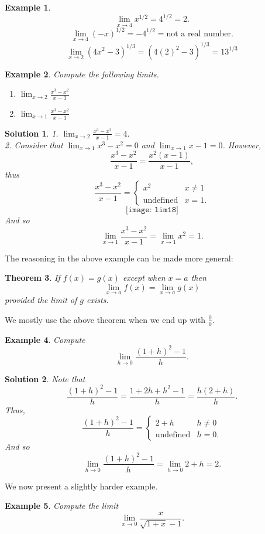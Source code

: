 \documentclass[12pt,a4paper]{book}
\newtheorem{theorem}{Theorem}[section]
\newtheorem{Example}[theorem]{Example}
\numberwithin{equation}{section}
\newtheorem*{solution}{{\bf Solution}}
\begin{document}
\begin{Example}
	$$\lim_{x\to 4}x^{1/2}=4^{1/2}=2.$$
	$$\lim_{x\to 4}(-x)^{1/2}=-4^{1/2}=\text{not a real number}.$$
	$$ \lim_{x\to 2} (4x^2-3)^{1/3}= (4(2)^2-3)^{1/3}=13^{1/3}$$
\end{Example}

\begin{Example} Compute the following limits.
\begin{enumerate}	
	\item $\lim_{x\to 2} \frac{x^3-x^2}{x-1}$
\item $\lim_{x\to 1} \frac{x^3-x^2}{x-1}$
\end{enumerate}
\end{Example}

\begin{solution}
	1. $\lim_{x\to 2} \frac{x^3-x^2}{x-1}=4.$\\
	2. Consider that $\lim_{x\to 1} {x^3-x^2}=0$ and $\lim_{x\to 1} {x-1}=0$. However, 
	$$ \frac{x^3-x^2}{x-1}=\frac{x^2(x-1)}{x-1},$$ thus
	$$ \frac{x^3-x^2}{x-1}=\begin{cases}
	x^2 & x\neq 1\\
	\text{undefined} & x=1.
	\end{cases}
	$$
		$$
	\texttt{[image: lim18]}
	$$
	And so
	$$ \lim_{x\to 1} \frac{x^3-x^2}{x-1}=\lim_{x\to 1} {x^2}=1. $$
\end{solution}
The reasoning in the above example can be made more general:
\begin{theorem}
	If $f(x)=g(x)$ except when $x=a$ then $$\lim_{x\to a} f(x)=\lim_{x\to a} g(x)$$ provided the limit of $g$ exists. 
\end{theorem}
We mostly use the above theorem when we end up with $\frac{0}{0}$.

\begin{Example}
	Compute 
	$$\lim_{h\to 0} \frac{(1+h)^2-1}{h}.$$
\end{Example}
\begin{solution}
	Note that 
	$$\frac{(1+h)^2-1}{h}=\frac{1+2h+h^2-1}{h}=\frac{h(2+h)}{h}.$$ Thus,
	$$\frac{(1+h)^2-1}{h}=\begin{cases}
	2+h & h\neq 0\\
	\text{undefined} & h=0.
	\end{cases}$$
	And so $$\lim_{h\to 0}\frac{(1+h)^2-1}{h}=\lim_{h\to 0}2+h=2.$$
\end{solution}
We now present a slightly harder example.
\begin{Example}
	Compute the limit 
	$$\lim_{x\to 0}\frac{x}{\sqrt{1+x}-1}.$$
\end{Example}
\end{document}
